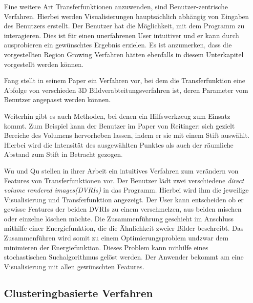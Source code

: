 Eine weitere Art Transferfunktionen anzuwenden, sind Benutzer-zentrische Verfahren. Hierbei werden Visualisierungen hauptsächlich abhängig von Eingaben des Benutzers erstellt. Der Benutzer hat die Möglichkeit, mit dem Programm zu interagieren. Dies ist für einen unerfahrenen User intuitiver und er kann durch ausprobieren ein gewünschtes Ergebnis erzielen. Es ist anzumerken, dass die vorgestellten Region Growing Verfahren hätten ebenfalls in diesem Unterkapitel vorgestellt werden können.


Fang stellt in seinem Paper \cite{fang1998image} ein Verfahren vor, bei dem die  Transferfunktion eine Abfolge von verschieden 3D Bildverabteitungsverfahren ist, deren Parameter vom Benutzer angepasst werden können.


Weiterhin gibt es auch Methoden, bei denen ein Hilfswerkzeug zum Einsatz kommt. Zum Beispiel kann der Benutzer im Paper von Reitinger: \cite{reitinger2004user} sich gezielt Bereiche des Volumens hervorheben lassen, indem er sie mit einem Stift auswählt. Hierbei wird die Intensität des ausgewählten Punktes als auch der räumliche Abstand zum Stift in Betracht gezogen.


Wu und Qu stellen in ihrer Arbeit \cite{wu2007interactive} ein intuitives Verfahren zum verändern von Features von Transferfunktionen vor.
\newline
Der Benutzer lädt zwei verschiedene \textit{direct volume rendered images(DVRIs)} in das Programm. Hierbei wird ihm die jeweilige Visualisierung und Transferfunktion angezeigt. Der User kann entscheiden ob er gewisse Features der beiden DVRIs zu einem verschmelzen, aus beiden mischen oder einzelne löschen möchte. Die Zusammenführung geschieht im Anschluss mithilfe einer Energiefunktion, die die Ähnlichkeit zweier Bilder beschreibt. Das Zusammenführen wird somit zu einem Optimierungsproblem undzwar dem minimieren der Energiefunktion. Dieses Problem kann mithilfe eines stochastischen Suchalgorithmus gelöst werden. Der Anwender bekommt am eine Visualisierung mit allen gewünschten Features.



\subsection{Clusteringbasierte Verfahren}

